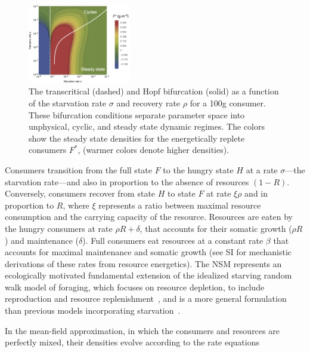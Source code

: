 \documentclass{pnastwo}
\begin{document}
\begin{article}
\begin{figure}
\centering
\includegraphics[width=0.4\textwidth]{fig_FixedPoint2.eps}
\caption{\small{ The transcritical (dashed) and Hopf bifurcation (solid) as a
  function of the starvation rate $\sigma$ and recovery rate $\rho$ for a 100g consumer.  These
  bifurcation conditions separate parameter space into unphysical, cyclic,
  and steady state dynamic regimes.  The colors show the steady state densities for the energetically replete consumers $F^*$, (warmer colors denote higher densities).  
  \vspace{-2mm}}}
\label{fig:fp}
\end{figure}

Consumers transition from the full state $F$ to the hungry state $H$ at a rate $\sigma$---the starvation rate---and also in proportion to the absence of resources $(1-R)$.  Conversely, consumers recover from state $H$ to state $F$ at rate $\xi \rho$ and in proportion to $R$, where $\xi$ represents a ratio between maximal resource consumption and the carrying capacity of the resource. %
Resources are eaten by the hungry consumers at rate $\rho R + \delta$, that accounts for their somatic growth ($\rho R$) and  maintenance ($\delta$). Full consumers eat resources at a constant rate $\beta$ that accounts for maximal maintenance and somatic growth (see SI for mechanistic derivations of these rates from resource energetics).
The NSM represents an ecologically motivated fundamental extension of the idealized starving random walk model of foraging, which focuses on resource depletion, to include reproduction and resource replenishment~\cite{Benichou:2014wu,Benichou:2016wl,Chupeau:2016jf}, and is a more general formulation than previous models incorporating starvation~\cite{Persson:1998hz}.

In the mean-field approximation, in which the consumers and resources are perfectly mixed, their densities evolve according to the rate equations


\end{article}
\end{document}
